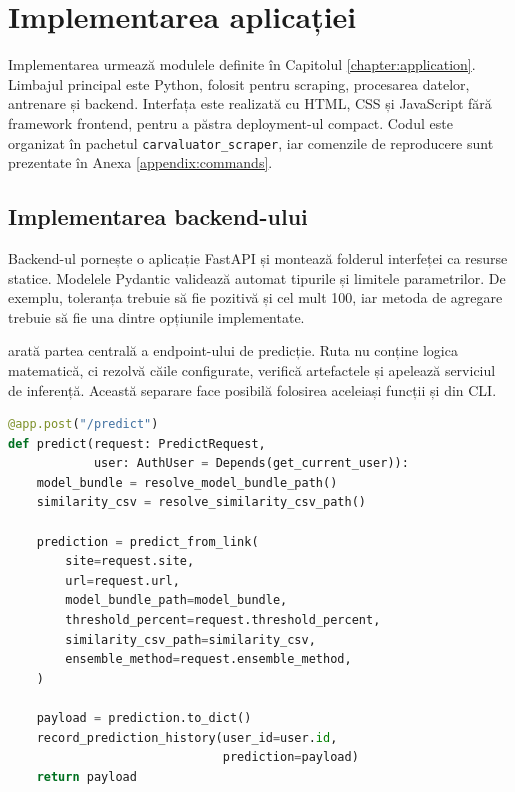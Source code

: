 \chapter{Implementarea aplicației}
\label{chapter:implementation}

Implementarea urmează modulele definite în Capitolul \ref{chapter:application}. Limbajul principal este Python, folosit pentru scraping, procesarea datelor, antrenare și backend. Interfața este realizată cu HTML, CSS și JavaScript fără framework frontend, pentru a păstra deployment-ul compact. Codul este organizat în pachetul \texttt{carvaluator\_scraper}, iar comenzile de reproducere sunt prezentate în Anexa \ref{appendix:commands}.





\section{Implementarea backend-ului}
\label{sec:implementation-backend}

Backend-ul pornește o aplicație FastAPI și montează folderul interfeței ca resurse statice. Modelele Pydantic validează automat tipurile și limitele parametrilor. De exemplu, toleranța trebuie să fie pozitivă și cel mult 100, iar metoda de agregare trebuie să fie una dintre opțiunile implementate.

 arată partea centrală a endpoint-ului de predicție. Ruta nu conține logica matematică, ci rezolvă căile configurate, verifică artefactele și apelează serviciul de inferență. Această separare face posibilă folosirea aceleiași funcții și din CLI.

\begin{lstlisting}[language=Python,caption={Orchestrarea predicției în endpoint-ul FastAPI},label={lst:backend-predict}]
@app.post("/predict")
def predict(request: PredictRequest,
            user: AuthUser = Depends(get_current_user)):
    model_bundle = resolve_model_bundle_path()
    similarity_csv = resolve_similarity_csv_path()

    prediction = predict_from_link(
        site=request.site,
        url=request.url,
        model_bundle_path=model_bundle,
        threshold_percent=request.threshold_percent,
        similarity_csv_path=similarity_csv,
        ensemble_method=request.ensemble_method,
    )

    payload = prediction.to_dict()
    record_prediction_history(user_id=user.id,
                              prediction=payload)
    return payload
\end{lstlisting}

